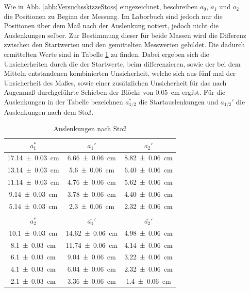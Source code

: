 			Wie in Abb. \ref{abb:VersuchsskizzeStoss} eingezeichnet, beschreiben $a_0$, $a_1$ und $a_2$  die Positionen zu Beginn der Messung. Im Laborbuch sind jedoch nur die Positionen über dem Maß nach der Auslenkung notiert, jedoch nicht die Auslenkungen selber. Zur Bestimmung dieser für beide Massen wird die Differenz zwischen den Startwerten und den gemittelten Messwerten gebildet. Die dadurch ermittelten Werte sind in Tabelle \ref{tab:Messwerte2} zu finden. Dabei ergeben sich die Unsicherheiten durch die der Startwerte, beim differenzieren, sowie der bei dem Mitteln entstandenen kombinierten Unsicherheit, welche sich aus fünf mal der Unsicherheit des Maßes, sowie einer zusätzlichen Unsicherheit für das nach Augenmaß durchgeführte Schieben der Blöcke von \SI{0,05}{\cm} ergibt. Für die Auslenkungen in der Tabelle bezeichnen $a_{1/2}^{*}$ die Startauslenkungen und $a_{1/2}'$ die Auslenkungen nach dem Stoß. 	
			\begin{table}[ht]
				\caption{Auslenkungen nach Stoß}
				\centering
				\label{tab:Messwerte2}
	
				\begin{tabular}{c|c|c}
					{$a_{1}^{*}$} & {$\bar{a_{1}}'$} & {$\bar{a_{2}}'$}	\\
					\hline
					{\SI{17,14+-0,03}{\cm}} & {\SI{6,66+-0,06}{\cm}} & {\SI{8,82+-0,06}{\cm}}\\
					{\SI{13,14+-0,03}{\cm}} & {\SI{5,6+-0,06}{\cm}} & {\SI{6,40+-0,06}{\cm}}\\
					{\SI{11,14+-0,03}{\cm}} & {\SI{4,76+-0,06}{\cm}} & {\SI{5,62+-0,06}{\cm}}\\
					{\SI{9,14+-0,03}{\cm}} & {\SI{3,78+-0,06}{\cm}} & {\SI{4,40+-0,06}{\cm}}\\
					{\SI{5,14+-0,03}{\cm}} & {\SI{2,3+-0,06}{\cm}} & {\SI{2,32+-0,06}{\cm}}\\		
					\hline 
					& & \\
					{$a_{2}^{*}$} & {$\bar{a_{1}}'$} & {$\bar{a_{2}}'$}	\\
					\hline
					{\SI{10,1+-0,03}{\cm}} & {\SI{14,62+-0,06}{\cm}} & {\SI{4,98+-0,06}{\cm}}\\
					{\SI{8,1+-0,03}{\cm}} & {\SI{11,74+-0,06}{\cm}} & {\SI{4,14+-0,06}{\cm}}\\
					{\SI{6,1+-0,03}{\cm}} & {\SI{9,04+-0,06}{\cm}} & {\SI{3,22+-0,06}{\cm}}\\
					{\SI{4,1+-0,03}{\cm}} & {\SI{6,04+-0,06}{\cm}} & {\SI{2,32+-0,06}{\cm}}\\
					{\SI{2,1+-0,03}{\cm}} & {\SI{3,36+-0,06}{\cm}} & {\SI{1,4+-0,06}{\cm}}\\	
				\end{tabular}	
			\end{table}
	
